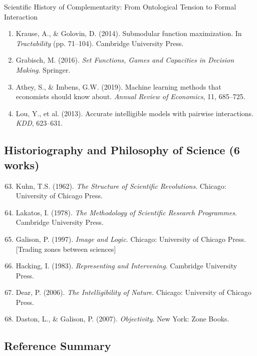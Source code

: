 \begin{chapter}{Scientific History of Complementarity: From Ontological Tension to Formal Interaction}
\begin{enumerate}
    \item Krause, A., \& Golovin, D. (2014). Submodular function maximization. In \textit{Tractability} (pp. 71--104). Cambridge University Press.

    \item Grabisch, M. (2016). \textit{Set Functions, Games and Capacities in Decision Making}. Springer.

    \item Athey, S., \& Imbens, G.W. (2019). Machine learning methods that economists should know about. \textit{Annual Review of Economics}, 11, 685--725.

    \item Lou, Y., et al. (2013). Accurate intelligible models with pairwise interactions. \textit{KDD}, 623--631.
\end{enumerate}

\subsection{Historiography and Philosophy of Science (6 works)}

\begin{enumerate}
    \setcounter{enumi}{62}
    \item Kuhn, T.S. (1962). \textit{The Structure of Scientific Revolutions}. Chicago: University of Chicago Press.

    \item Lakatos, I. (1978). \textit{The Methodology of Scientific Research Programmes}. Cambridge University Press.

    \item Galison, P. (1997). \textit{Image and Logic}. Chicago: University of Chicago Press. [Trading zones between sciences]

    \item Hacking, I. (1983). \textit{Representing and Intervening}. Cambridge University Press.

    \item Dear, P. (2006). \textit{The Intelligibility of Nature}. Chicago: University of Chicago Press.

    \item Daston, L., \& Galison, P. (2007). \textit{Objectivity}. New York: Zone Books.
\end{enumerate}

\subsection{Reference Summary}


\end{chapter}
